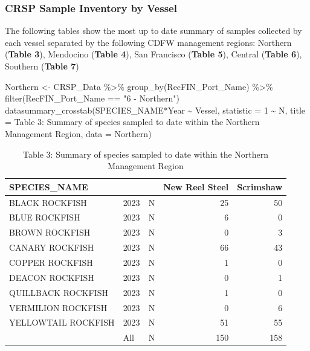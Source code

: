 \documentclass[
  letterpaper,
  DIV=11,
  numbers=noendperiod]{scrartcl}
\newenvironment{Shaded}{\begin{snugshade}}{\end{snugshade}}
\newcommand{\AttributeTok}[1]{\textcolor[rgb]{0.40,0.45,0.13}{#1}}
\newcommand{\DecValTok}[1]{\textcolor[rgb]{0.68,0.00,0.00}{#1}}
\newcommand{\FunctionTok}[1]{\textcolor[rgb]{0.28,0.35,0.67}{#1}}
\newcommand{\NormalTok}[1]{\textcolor[rgb]{0.00,0.23,0.31}{#1}}
\newcommand{\OtherTok}[1]{\textcolor[rgb]{0.00,0.23,0.31}{#1}}
\newcommand{\SpecialCharTok}[1]{\textcolor[rgb]{0.37,0.37,0.37}{#1}}
\newcommand{\StringTok}[1]{\textcolor[rgb]{0.13,0.47,0.30}{#1}}
\begin{document}
\hypertarget{crsp-sample-inventory-by-vessel}{%
\subsubsection{CRSP Sample Inventory by
Vessel}\label{crsp-sample-inventory-by-vessel}}

The following tables show the most up to date summary of samples
collected by each vessel separated by the following CDFW management
regions: Northern (\textbf{Table 3}), Mendocino (\textbf{Table 4}), San
Francisco (\textbf{Table 5}), Central (\textbf{Table 6}), Southern
(\textbf{Table 7})

\begin{Shaded}
\begin{Highlighting}[]
\NormalTok{Northern }\OtherTok{\textless{}{-}}\NormalTok{ CRSP\_Data }\SpecialCharTok{\%\textgreater{}\%}
  \FunctionTok{group\_by}\NormalTok{(RecFIN\_Port\_Name) }\SpecialCharTok{\%\textgreater{}\%}
  \FunctionTok{filter}\NormalTok{(RecFIN\_Port\_Name }\SpecialCharTok{==} \StringTok{"6 {-} Northern"}\NormalTok{)}
\FunctionTok{datasummary\_crosstab}\NormalTok{(SPECIES\_NAME}\SpecialCharTok{*}\NormalTok{Year }\SpecialCharTok{\textasciitilde{}}\NormalTok{ Vessel, }\AttributeTok{statistic =} \DecValTok{1} \SpecialCharTok{\textasciitilde{}}\NormalTok{ N, }\AttributeTok{title =} \StringTok{\textquotesingle{}Table 3: Summary of species sampled to date within the Northern Management Region\textquotesingle{}}\NormalTok{, }\AttributeTok{data =}\NormalTok{ Northern)}
\end{Highlighting}
\end{Shaded}

\begin{table}

\caption{Table 3: Summary of species sampled to date within the Northern Management Region}
\centering
\begin{tabular}[t]{lllrr}
\toprule
SPECIES\_NAME &   &    & New Reel Steel & Scrimshaw\\
\midrule
BLACK ROCKFISH & 2023 & N & 25 & 50\\
BLUE ROCKFISH & 2023 & N & 6 & 0\\
BROWN ROCKFISH & 2023 & N & 0 & 3\\
CANARY ROCKFISH & 2023 & N & 66 & 43\\
COPPER ROCKFISH & 2023 & N & 1 & 0\\
DEACON ROCKFISH & 2023 & N & 0 & 1\\
QUILLBACK ROCKFISH & 2023 & N & 1 & 0\\
VERMILION ROCKFISH & 2023 & N & 0 & 6\\
YELLOWTAIL ROCKFISH & 2023 & N & 51 & 55\\
 & All & N & 150 & 158\\
\bottomrule
\end{tabular}
\end{table}
\end{document}
